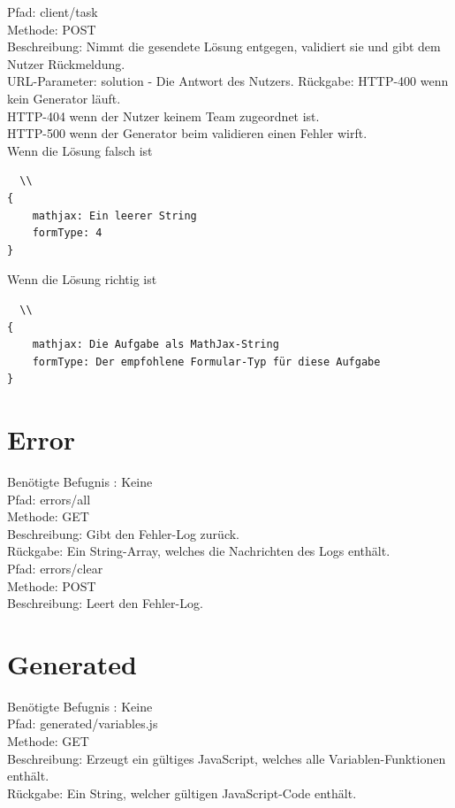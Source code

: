\noindent Pfad: client/task \\
Methode: POST \\
Beschreibung: Nimmt die gesendete Lösung entgegen, validiert sie und gibt dem Nutzer Rückmeldung. \\
URL-Parameter: solution - Die Antwort des Nutzers.
Rückgabe: HTTP-400 wenn kein Generator läuft. \\
HTTP-404 wenn der Nutzer keinem Team zugeordnet ist. \\
HTTP-500 wenn der Generator beim validieren einen Fehler wirft. \\
Wenn die Lösung falsch ist \begin{lstlisting}  \\
{
	mathjax: Ein leerer String
	formType: 4
}
\end{lstlisting}
Wenn die Lösung richtig ist \begin{lstlisting}  \\
{
	mathjax: Die Aufgabe als MathJax-String
	formType: Der empfohlene Formular-Typ für diese Aufgabe
}
\end{lstlisting}


\section{Error}

Benötigte Befugnis : Keine \\

\noindent Pfad: errors/all\\
Methode: GET \\
Beschreibung: Gibt den Fehler-Log zurück. \\
Rückgabe: Ein String-Array, welches die Nachrichten des Logs enthält. \\

\noindent Pfad: errors/clear\\
Methode: POST \\
Beschreibung: Leert den Fehler-Log. \\

\section{Generated}

Benötigte Befugnis : Keine \\

\noindent Pfad: generated/variables.js\\
Methode: GET \\
Beschreibung: Erzeugt ein gültiges JavaScript, welches alle Variablen-Funktionen enthält. \\
Rückgabe: Ein String, welcher gültigen JavaScript-Code enthält. \\

